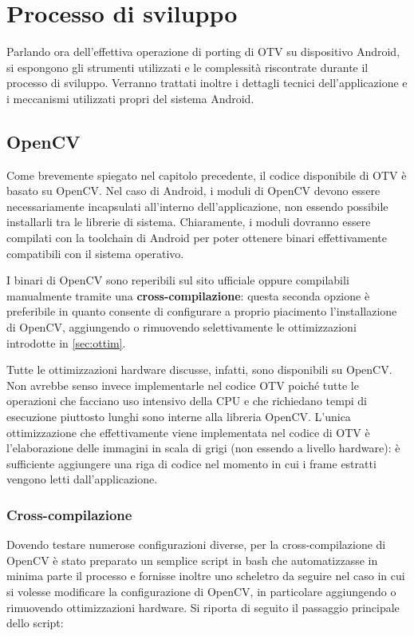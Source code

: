 \chapter{Processo di sviluppo}

Parlando ora dell'effettiva operazione di porting di OTV su dispositivo Android, si espongono gli strumenti utilizzati
e le complessità riscontrate durante il processo di sviluppo. Verranno trattati inoltre i dettagli tecnici dell'applicazione
e i meccanismi utilizzati propri del sistema Android.

\section{OpenCV}

Come brevemente spiegato nel capitolo precedente, il codice disponibile di OTV è basato su OpenCV.
Nel caso di Android, i moduli di OpenCV devono essere necessariamente incapsulati all'interno dell'applicazione, non essendo
possibile installarli tra le librerie di sistema. Chiaramente, i moduli dovranno essere compilati con la toolchain di Android
per poter ottenere binari effettivamente compatibili con il sistema operativo.

I binari di OpenCV sono reperibili sul sito ufficiale oppure compilabili manualmente tramite una
\textbf{cross-compilazione}: questa seconda opzione è preferibile in quanto consente di configurare a proprio piacimento
l'installazione di OpenCV, aggiungendo o rimuovendo selettivamente le ottimizzazioni introdotte in \autoref{sec:ottim}.

Tutte le ottimizzazioni hardware discusse, infatti, sono disponibili su OpenCV. 
Non avrebbe senso invece implementarle nel codice OTV poiché tutte le operazioni che facciano uso intensivo della CPU e 
che richiedano tempi di esecuzione piuttosto lunghi sono interne alla libreria OpenCV.
L'unica ottimizzazione che effettivamente viene implementata nel codice di OTV è l'elaborazione delle immagini in scala di
grigi (non essendo a livello hardware): è sufficiente aggiungere una riga di codice nel momento in cui i frame estratti vengono
letti dall'applicazione.

\subsection{Cross-compilazione}

Dovendo testare numerose configurazioni diverse, per la cross-compilazione di OpenCV è stato preparato un semplice script 
in bash che automatizzasse in minima parte il processo e fornisse inoltre uno scheletro da seguire nel caso in cui si 
volesse modificare la configurazione di OpenCV, in particolare aggiungendo o rimuovendo ottimizzazioni hardware. 
Si riporta di seguito il passaggio principale dello script:


